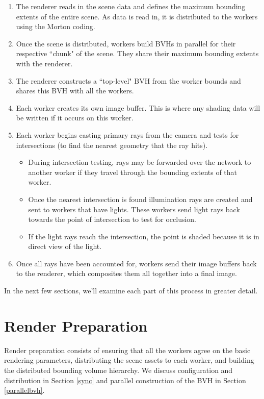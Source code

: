 \documentclass[12pt]{ucthesis}
\begin{document}
\begin{enumerate}
    \item The renderer reads in the scene data and defines the maximum bounding
        extents of the entire scene. As data is read in, it is distributed to
        the workers using the Morton coding.
    \item Once the scene is distributed, workers build BVHs in parallel for
        their respective ``chunk" of the scene. They share their maximum bounding
        extents with the renderer.
    \item The renderer constructs a ``top-level" BVH from the worker bounds and
        shares this BVH with all the workers.
    \item Each worker creates its own image buffer. This is where any shading
        data will be written if it occurs on this worker.
    \item Each worker begins casting primary rays from the camera and tests for
        intersections (to find the nearest geometry that the ray hits).
        \begin{itemize}
            \item During intersection testing, rays may be forwarded over the
                network to another worker if they travel through the bounding
                extents of that worker.
            \item Once the nearest intersection is found illumination rays are
                created and sent to workers that have lights. These workers
                send light rays back towards the point of intersection to test
                for occlusion.
            \item If the light rays reach the intersection, the point is shaded
                because it is in direct view of the light.
        \end{itemize}
    \item Once all rays have been accounted for, workers send their image
        buffers back to the renderer, which composites them all together into
        a final image.
\end{enumerate}

In the next few sections, we'll examine each part of this process in greater
detail.

\section{Render Preparation}
\label{prep}

Render preparation consists of ensuring that all the workers agree on the
basic rendering parameters, distributing the scene assets to each worker, and
building the distributed bounding volume hierarchy. We discuss configuration
and distribution in Section \ref{sync} and parallel construction of the BVH in
Section \ref{parallelbvh}.
\end{document}
